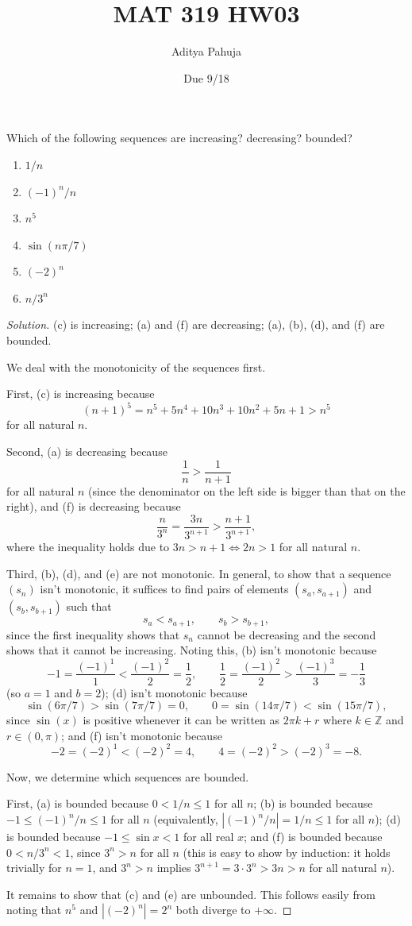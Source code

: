 \documentclass[11pt]{scrartcl}
\title{\vspace{-2em}MAT 319 HW03}
\author{\large Aditya Pahuja}
\date{\large Due 9/18}
\providecommand{\ZZ}{\mathbb Z}
\providecommand{\ii}{\item}
\theoremstyle{problem}
\newenvironment{problem}[1]
{\renewcommand\theinnercustomthm{#1}\innercustomthm}
{\endinnercustomthm}
\theoremstyle{remark}
\newenvironment{soln}{\begin{proof}[Solution]}{\end{proof}}
\begin{document}
\maketitle

\begin{problem}{10.1}
	Which of the following sequences are increasing? decreasing? bounded?
	\begin{enumerate}[\emph{\textbf{(\alph*)}}]
		\ii $1/n$
		\ii $(-1)^n/n$
		\ii $n^5$
		\ii $\sin(n\pi/7)$
		\ii $(-2)^n$
		\ii $n/3^n$
	\end{enumerate}
\end{problem}
\begin{soln}
	(c) is increasing; (a) and (f) are decreasing; (a), (b), (d), and (f)
	are bounded.
	
	We deal with the monotonicity of the sequences first.
	
	First, (c) is increasing because
	\[(n + 1)^5 = n^5 + 5n^4 + 10n^3 + 10n^2 + 5n + 1 > n^5\]
	for all natural $n$.
	
	Second, (a) is decreasing because
	\[\frac{1}{n} > \frac{1}{n + 1}\]
	for all natural $n$ (since the denominator on the left side
	is bigger than that on the right), and (f) is decreasing because
	\[\frac{n}{3^n} = \frac{3n}{3^{n+1}} > \frac{n + 1}{3^{n+1}},\]
	where the inequality holds due to $3n > n + 1 \iff 2n > 1$
	for all natural $n$.
	
	Third, (b), (d), and (e) are not monotonic.
	In general, to show that a sequence $(s_n)$ isn't monotonic,
	it suffices to find pairs of elements $(s_a, s_{a+1})$
	and $(s_b, s_{b+1})$ such that
	\[s_a < s_{a+1},\qquad s_b > s_{b+1},\]
	since the first inequality shows that $s_n$ cannot be decreasing
	and the second shows that it cannot be increasing.
	Noting this, (b) isn't monotonic because
	\[-1 = \frac{(-1)^1}{1} < \frac{(-1)^2}{2} = \frac12,\qquad
	\frac12 = \frac{(-1)^2}{2} > \frac{(-1)^3}{3} = -\frac13\]
	(so $a = 1$ and $b = 2$); (d) isn't monotonic because
	\[\sin(6\pi/7) > \sin(7\pi/7) = 0,\qquad
	0 = \sin(14\pi/7) < \sin(15\pi/7),\]
	since $\sin(x)$ is positive whenever it can be written as
	$2\pi k + r$ where $k\in\ZZ$ and $r\in(0,\pi)$;
	and (f) isn't monotonic because
	\[-2 = (-2)^1 < (-2)^2 = 4,\qquad
	4 = (-2)^2 > (-2)^3 = -8.\]
	
	Now, we determine which sequences are bounded.
	
	First, (a) is bounded because $0 < 1/n \le 1$ for all $n$;
	(b) is bounded because $-1 \le (-1)^n/n \le 1$ for all $n$ (equivalently,
	$|(-1)^n/n| = 1/n \le 1$ for all $n$);
	(d) is bounded because $-1 \le \sin x < 1$ for all real $x$;
	and (f) is bounded because $0 < n/3^n < 1$, since $3^n > n$ for all $n$
	(this is easy to show by induction: it holds trivially for $n=1$,
	and $3^n > n$ implies $3^{n+1} = 3\cdot 3^n > 3n > n$ for all natural $n$).
	
	It remains to show that (c) and (e) are unbounded.
	This follows easily from noting that $n^5$ and $|(-2)^n| = 2^n$
	both diverge to $+\infty$.
\end{soln}
\end{document}
